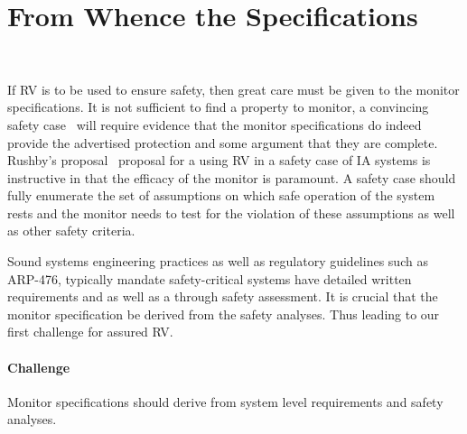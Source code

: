 \section{From Whence the Specifications}~\label{sec:req}

If RV is to be used to ensure safety, then great care must be given to
the monitor specifications.  It is not sufficient to find a property
to monitor, a convincing safety case~\cite{Kelly98arguingsafety} will
require evidence that the monitor specifications do indeed provide the
advertised protection and some argument that they are complete.
Rushby's proposal~\cite{rvRushby,RushbyAIAA09} proposal for a using RV
in a safety case of IA systems is instructive in that the efficacy of
the monitor is paramount.  A safety case should fully enumerate the
set of assumptions on which safe operation of the system rests and the
monitor needs to test for the violation of these assumptions as well
as other safety criteria. 


 Sound systems engineering practices  as well
as regulatory guidelines such as ARP-476,  typically mandate safety-critical systems
have detailed written requirements and as well as a through safety
assessment.  It is crucial that the monitor specification be derived
from the safety analyses. Thus leading to our first challenge for
assured RV.

\paragraph{Challenge}   Monitor specifications should derive from system level
requirements and safety analyses. 





